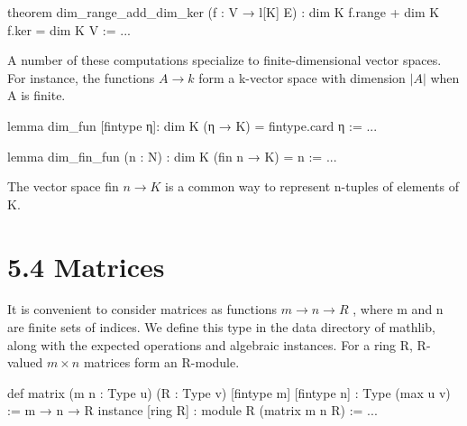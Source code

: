 \documentclass[
]{article}
\newenvironment{Shaded}{}{}
\newcommand{\BuiltInTok}[1]{\textcolor[rgb]{0.00,0.50,0.00}{#1}}
\newcommand{\NormalTok}[1]{#1}
\newcommand{\OperatorTok}[1]{\textcolor[rgb]{0.40,0.40,0.40}{#1}}
\begin{document}
\begin{Shaded}
\begin{Highlighting}[]
\NormalTok{theorem dim\_range\_add\_dim\_ker (f : V → l[K] E) :}
\NormalTok{dim K f.}\BuiltInTok{range} \OperatorTok{+}\NormalTok{ dim K f.ker }\OperatorTok{=}\NormalTok{ dim K V }\OperatorTok{:=}\NormalTok{ ... }
\end{Highlighting}
\end{Shaded}

A number of these computations specialize to finite-dimensional vector
spaces. For instance, the functions \(A \rightarrow k\) form a k-vector
space with dimension \(|A|\) when A is finite.

\begin{Shaded}
\begin{Highlighting}[]
\NormalTok{lemma dim\_fun [fintype η]:}
\NormalTok{dim K (η → K) = fintype.card η := ... }
\end{Highlighting}
\end{Shaded}

\begin{Shaded}
\begin{Highlighting}[]
\NormalTok{lemma dim\_fin\_fun (n : N) :}
\NormalTok{dim K (fin n → K) = n := ... }
\end{Highlighting}
\end{Shaded}

The vector space fin \(n \rightarrow K\) is a common way to represent
n-tuples of elements of K.

\section{5.4 Matrices}\label{matrices}

It is convenient to consider matrices as functions
\(m \rightarrow n \rightarrow R\) , where m and n are finite sets of
indices. We define this type in the data directory of mathlib, along
with the expected operations and algebraic instances. For a ring R,
R-valued \(m \times n\) matrices form an R-module.

\begin{Shaded}
\begin{Highlighting}[]
\NormalTok{def matrix (m n : Type u) (R : Type v)}
\NormalTok{    [fintype m] [fintype n] : Type (max u v) := m → n → R}
\NormalTok{instance [ring R] : module R (matrix m n R) := ... }
\end{Highlighting}
\end{Shaded}
\end{document}
